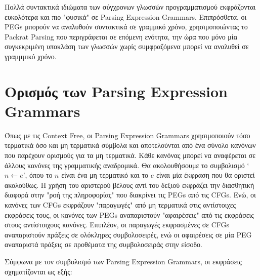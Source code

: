 \documentclass[diploma]{softlab-thesis}
\begin{document}
Πολλά συντακτικά ιδιώματα των σύγχρονων γλωσσών προγραμματισμού εκφράζονται ευκολότερα και πιο "φυσικά" σε  Parsing Expression Grammars. 
Επιπρόσθετα, οι PEGs μπορούν να αναλυθούν συντακτικά σε γραμμικό χρόνο, χρησιμοποιώντας το  Packrat Parsing  που περιγράφεται σε επόμενη ενότητα, την ώρα που μόνο μία συγκεκριμένη υποκλάση των γλωσσών χωρίς συμφραζόμενα μπορεί να αναλυθεί σε γραμμμικό χρόνο.

\section{Ορισμός των  Parsing Expression Grammars}
 Όπως με τις  Context Free,  οι  Parsing Expression Grammars χρησιμοποιούν τόσο τερματικά όσο και μη τερματικά σύμβολα και αποτελούνται από ένα σύνολο κανόνων που παρέχουν ορισμούς για τα μη τερματικά.
Κάθε κανόνας μπορεί να αναφέρεται σε άλλους κανόνες της γραμματικής αναδρομικά. Θα ακολουθήσουμε το συμβολισμό `$ n \leftarrow e $', όπου το $ n$ είναι ένα μη τερματικό και το $e$ είναι μία έκφραση που θα οριστεί ακολούθως. 
Η χρήση του αριστερού βέλους αντί του δεξιού εκφράζει την διασθητική διαφορά στην "ροή της πληροφορίας" που διακρίνει τις  PEGs από τις CFGs. 
Ενώ, οι κανόνες των CFGs εκφράζουν "παραγωγές" από μη τερματικά στις αντίστοιχες εκφράσεις τους, οι κανόνες των  PEGs αναπαριστούν "αφαιρέσεις" από τις εκφράσεις στους αντίστοιχους κανόνες. 
Επιπλέον, οι παραγωγές εκφρασμένες σε CFGs αναπαριστούν πράξεις σε ολόκληρες συμβολοσειρές, ενώ οι αφαιρέσεις σε μία  PEG  αναπαριστά πράξεις σε προθέματα της συμβολοσειράς στην είσοδο.

Σύμφωνα με τον συμβολισμό των  Parsing Expression Grammars, οι εκφράσεις σχηματίζονται ως εξής:
\end{document}
